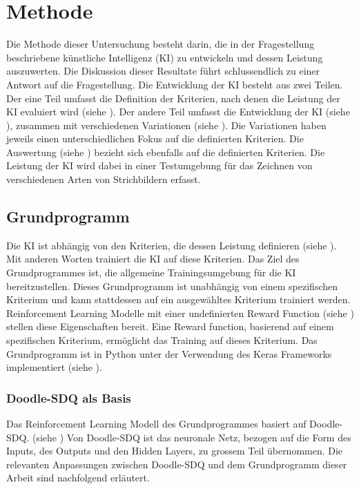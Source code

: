 \chapter{Methode}\label{chap:m}
Die Methode dieser Untersuchung besteht darin, die in der Fragestellung
beschriebene künstliche Intelligenz (KI) zu entwickeln und dessen Leistung
auszuwerten. Die Diskussion dieser Resultate führt schlussendlich zu einer
Antwort auf die Fragestellung. Die Entwicklung der KI besteht aus zwei Teilen.
Der eine Teil umfasst die Definition der Kriterien, nach denen die Leistung der
KI evaluiert wird (siehe ). Der andere Teil umfasst die
Entwicklung der KI (siehe ), zusammen mit verschiedenen
Variationen (siehe ). Die Variationen haben jeweils einen
unterschiedlichen Fokus auf die definierten Kriterien. Die Auswertung (siehe
) bezieht sich ebenfalls auf die definierten Kriterien.
Die Leistung der KI wird dabei in einer Testumgebung für das Zeichnen von
verschiedenen Arten von Strichbildern erfasst.

\section{Grundprogramm}\label{chap:m_grund}
Die KI ist abhängig von den Kriterien, die dessen Leistung definieren (siehe
). Mit anderen Worten trainiert die KI auf diese Kriterien.
Das Ziel des Grundprogrammes ist, die allgemeine Trainingsumgebung für die KI
bereitzustellen. Dieses Grundprogramm ist unabhängig von einem spezifischen
Kriterium und kann stattdessen auf ein ausgewähltes Kriterium trainiert werden.
Reinforcement Learning Modelle mit einer undefinierten Reward Function (siehe
) stellen diese Eigenschaften bereit. Eine Reward
function, basierend auf einem spezifischen Kriterium, ermöglicht das Training
auf dieses Kriterium. Das Grundprogramm ist in Python unter der Verwendung des
Keras Frameworks implementiert (siehe ). 

\subsection{Doodle-SDQ als Basis}\label{sub:m_grund_dood}
Das Reinforcement Learning Modell des Grundprogrammes basiert auf Doodle-SDQ.
(siehe ) Von Doodle-SDQ ist das neuronale Netz, bezogen
auf die Form des Inputs, des Outputs und den Hidden Layers, zu grossem Teil
übernommen. Die relevanten Anpassungen zwischen Doodle-SDQ und dem Grundprogramm
dieser Arbeit sind nachfolgend erläutert.

